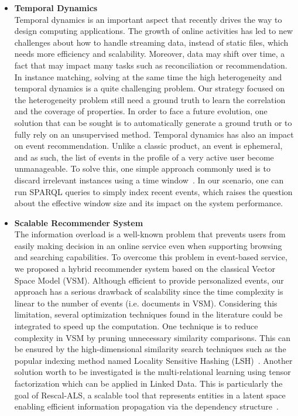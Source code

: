 \begin{itemize}
\item \textbf{Temporal Dynamics}
\vspace{1mm}
\\
Temporal dynamics is an important aspect that recently drives the way to design computing applications. The growth of online activities has led to new challenges about how to handle streaming data, instead of static files, which needs more efficiency and scalability. Moreover, data may shift over time, a fact that may impact many tasks such as reconciliation or recommendation. In instance matching, solving at the same time the high heterogeneity and temporal dynamics is a quite challenging problem. Our strategy focused on the heterogeneity problem still need a ground truth to learn the correlation and the coverage of properties. In order to face a future evolution, one solution that can be sought is to automatically generate a ground truth or to fully rely on an unsupervised method. Temporal dynamics has also an impact on event recommendation. Unlike a classic product, an event is ephemeral, and as such, the list of events in the profile of a very active user become unmanageable. To solve this, one simple approach commonly used is to discard irrelevant instances using a time window~\cite{Tsymbal:04}. In our scenario, one can run SPARQL queries to simply index recent events, which raises the question about the effective window size and its impact on the system performance. 

\item \textbf{Scalable Recommender System}
\vspace{1mm}
\\The information overload is a well-known problem that prevents users from easily making decision in an online service even when supporting browsing and searching capabilities. To overcome this problem in event-based service, we proposed a hybrid recommender system based on the classical Vector Space Model (VSM). Although efficient to provide personalized events, our approach has a serious drawback of scalability since the time complexity is linear to the number of events (i.e. documents in VSM). Considering this limitation, several optimization techniques found in the literature could be integrated to speed up the computation. One technique is to reduce complexity in VSM by pruning unnecessary similarity comparisons. This can be ensured by the high-dimensional similarity search techniques such as the popular indexing method named Locality Sensitive Hashing (LSH)~\cite{Gionis:VLDB99}. Another solution worth to be investigated is the multi-relational learning using tensor factorization which can be applied in Linked Data. This is particularly the goal of Rescal-ALS, a scalable tool that represents entities in a latent space enabling efficient information propagation via the dependency structure~\cite{Nickel:ECML13}.


\end{itemize}

